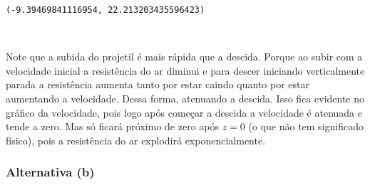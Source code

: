 \documentclass[12pt]{article}
\makeatletter
\newcommand{\boxspacing}{\kern\kvtcb@left@rule\kern\kvtcb@boxsep}
\newcommand{\prompt}[4]{
        {\ttfamily\llap{{\color{#2}[#3]:\hspace{3pt}#4}}\vspace{-\baselineskip}}
    }
\makeatother
\begin{document}
            \begin{tcolorbox}[breakable, size=fbox, boxrule=.5pt, pad at break*=1mm, opacityfill=0]
\prompt{Out}{outcolor}{22}{\boxspacing}
\begin{Verbatim}[commandchars=\\\{\}]
(-9.39469841116954, 22.213203435596423)
\end{Verbatim}
\end{tcolorbox}
        
    \begin{center}
    \end{center}
    { \hspace*{\fill} \\}
    
    Note que a subida do projetil é mais rápida que a descida. Porque ao
subir com a velocidade inicial a resistência do ar diminui e para descer
iniciando verticalmente parada a resistência aumenta tanto por estar
caindo quanto por estar aumentando a velocidade. Dessa forma, atenuando
a descida. Isso fica evidente no gráfico da velocidade, pois logo após
começar a descida a velocidade é atenuada e tende a zero. Mas só ficará
próximo de zero após \(z=0\) (o que não tem significado físico), pois a
resistência do ar explodirá exponencialmente.

    \hypertarget{alternativa-b}{%
\subsubsection{Alternativa (b)}\label{alternativa-b}}
\end{document}
